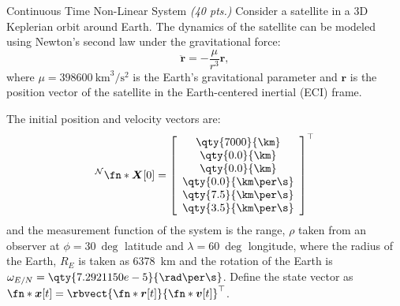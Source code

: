 \begin{hwkProblem}{3}{Continuous Time Non-Linear System \textit{(40 pts.)}} \label{hwk:p03}
	Consider a satellite in a 3D Keplerian orbit around Earth. The dynamics of the satellite can be modeled using Newton's second law under the gravitational force:
	\[
		\ddot{\boldsymbol{r}}=-\frac{\mu}{r^3} \boldsymbol{r},
	\]
	where \(\mu=\qty{398600}{\km\cubed\per\s\squared}\) is the Earth's gravitational parameter and \(\boldsymbol{r}\) is the position vector of the satellite in the Earth-centered inertial (ECI) frame.

	The initial position and velocity vectors are:
	\[
		{}^{\mathcal{N}} \fn*{\boldsymbol{X}}[0]=\left[\begin{array}{c}
				\qty{7000}{\km}      \\
				\qty{0.0}{\km}       \\
				\qty{0.0}{\km}       \\
				\qty{0.0}{\km\per\s} \\
				\qty{7.5}{\km\per\s} \\
				\qty{3.5}{\km\per\s}
			\end{array}\right]^{\top}
	\]
	and the measurement function of the system is the range, \(\rho\) taken from an observer at \(\phi=\qty{30}{\deg}\) latitude and \(\lambda=\qty{60}{\deg}\) longitude, where the radius of the Earth, \(R_E\) is taken as \qty{6378}{\km} and the rotation of the Earth is \(\omega_{E / N}=\qty{7.2921150e-5}{\rad\per\s}\). Define the state vector as \(\fn*{\boldsymbol{x}}[t]={\rbvect{\fn*{\boldsymbol{r}}[t]}{\fn*{\boldsymbol{v}}[t]}}^{\top}\).


\end{hwkProblem}
